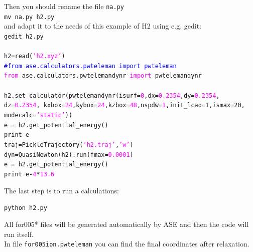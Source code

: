 \documentclass[10pt]{beamer}
\begin{document}


\begin{frame}
Then you should rename the file {\tt na.py}\\
{\tt mv na.py h2.py}\\
and adapt it to the needs of this example of H2 using e.g. gedit:\\
{\tt gedit h2.py}\\
~\\
\small{{\tt h2=read(\textcolor{magenta}{'h2.xyz'})\\
\textcolor{blue}{#from ase.calculators.pwteleman import pwteleman}\\
\textcolor{magenta}{from} ase.calculators.pwtelemandynr \textcolor{magenta}{import} pwtelemandynr\\
~\\
h2.set\_calculator(pwtelemandynr(isurf=\textcolor{magenta}{0},dx=\textcolor{magenta}{0.2354},dy=\textcolor{magenta}{0.2354},\\dz=\textcolor{magenta}{0.2354},
kxbox=\textcolor{magenta}{24},kybox=\textcolor{magenta}{24},kzbox=\textcolor{magenta}{48},nspdw=\textcolor{magenta}{1},init\_lcao=1,ismax=20,\\ modecalc=\textcolor{magenta}{'static'}))\\
e = h2.get\_potential\_energy()\\
print e\\
traj=PickleTrajectory(\textcolor{magenta}{'h2.traj'},\textcolor{magenta}{'w'})\\
dyn=QuasiNewton(h2).run(fmax=\textcolor{magenta}{0.0001})\\
e = h2.get\_potential\_energy()\\
print e-\textcolor{magenta}{4}*\textcolor{magenta}{13.6}}}
\end{frame}




\begin{frame}
The last step is to run a calculations:\\
\hspace*{0.2cm}

{\tt python h2.py}\\
\hspace*{0.2cm}

All for005* files will be generated automatically by ASE and then the code will run itself. \\
In file {\tt for005ion.pwteleman} you can find the final coordinates after relaxation. 

\end{frame}
\end{document}
